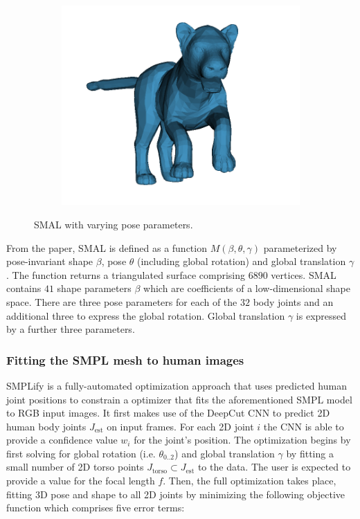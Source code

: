 \begin{figure}[H]
\begin{subfigure}{0.3\linewidth}
        \centering
            \includegraphics[width=1\linewidth]{smal/pose_3}
    \end{subfigure}%
    \caption{SMAL with varying pose parameters.}
    \label{fig:smal_model_poses}
\end{figure}

From the paper, SMAL is defined as a function $M(\beta, \theta, \gamma)$ parameterized by pose-invariant shape $\beta$, pose $\theta$ (including global rotation) and global translation $\gamma$. The function returns a triangulated surface comprising $6890$ vertices. SMAL contains $41$ shape parameters $\beta$ which are coefficients of a low-dimensional shape space. There are three pose parameters for each of the $32$ body joints and an additional three to express the global rotation. Global translation $\gamma$ is expressed by a further three parameters.

\subsubsection{Fitting the SMPL mesh to human images}
SMPLify \cite{bogo16keep} is a fully-automated optimization approach that uses predicted human joint positions to constrain a optimizer that fits the aforementioned SMPL model to RGB input images. It first makes use of the DeepCut CNN to predict 2D human body joints $J_{\text{est}}$ on input frames. For each 2D joint $i$ the CNN is able to provide a confidence value $w_i$ for the joint's position. The optimization begins by first solving for global rotation (i.e. $\theta_{0..2}$) and global translation $\gamma$ by fitting a small number of 2D torso points $J_{\text{torso}} \subset J_{\text{est}}$ to the data. The user is expected to provide a value for the focal length $f$. Then, the full optimization takes place, fitting 3D pose and shape to all 2D joints by minimizing the following objective function which comprises five error terms:

